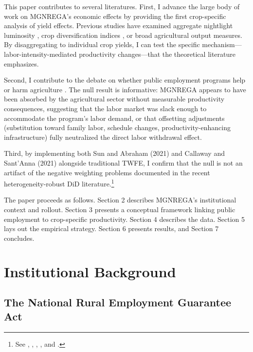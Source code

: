 \documentclass[12pt]{article}
\begin{document}
This paper contributes to several literatures. First, I advance the large body of work on MGNREGA's economic effects \citep{imbert2015labor, berg2018can, azam2012impact, klonner2019private, muralidharan2017general, zimmermann2012testing} by providing the first crop-specific analysis of yield effects. Previous studies have examined aggregate nightlight luminosity \citep{ravi2012impact}, crop diversification indices \citep{thomas2021effect}, or broad agricultural output measures. By disaggregating to individual crop yields, I can test the specific mechanism---labor-intensity-mediated productivity changes---that the theoretical literature emphasizes.

Second, I contribute to the debate on whether public employment programs help or harm agriculture \citep{gilligan2009impact, deininger2015impact, sukhtankar2017sweetening}. The null result is informative: MGNREGA appears to have been absorbed by the agricultural sector without measurable productivity consequences, suggesting that the labor market was slack enough to accommodate the program's labor demand, or that offsetting adjustments (substitution toward family labor, schedule changes, productivity-enhancing infrastructure) fully neutralized the direct labor withdrawal effect.

Third, by implementing both Sun and Abraham (2021) and Callaway and Sant'Anna (2021) alongside traditional TWFE, I confirm that the null is not an artifact of the negative weighting problems documented in the recent heterogeneity-robust DiD literature.\footnote{See \citet{sun2021estimating}, \citet{callaway2021difference}, \citet{de2020two}, \citet{goodman2021difference}, and \citet{borusyak2024revisiting}.}

The paper proceeds as follows. Section 2 describes MGNREGA's institutional context and rollout. Section 3 presents a conceptual framework linking public employment to crop-specific productivity. Section 4 describes the data. Section 5 lays out the empirical strategy. Section 6 presents results, and Section 7 concludes.

\section{Institutional Background}

\subsection{The National Rural Employment Guarantee Act}
\end{document}
